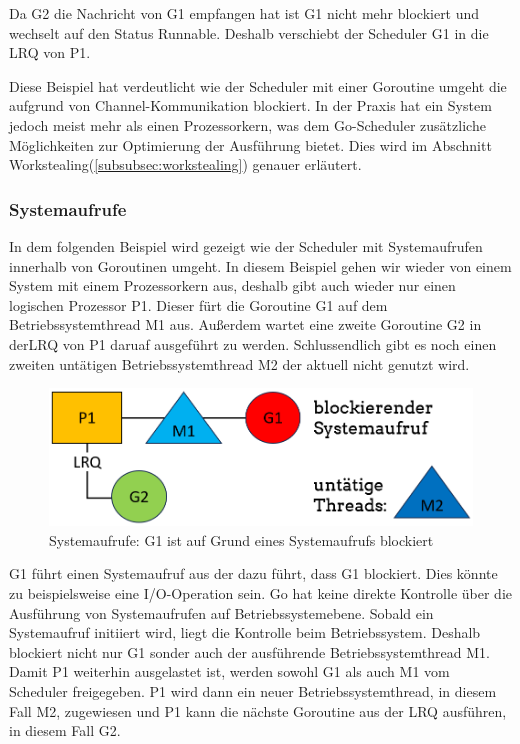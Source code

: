 \documentclass[fontsize=12pt,paper=a4,twoside=semi,parskip=half-,headsepline,headinclude]{scrreprt}
\begin{document}
Da G2 die Nachricht von G1 empfangen hat ist G1 nicht mehr blockiert und wechselt auf den Status Runnable. Deshalb verschiebt der Scheduler G1 in die LRQ von P1.

Diese Beispiel hat verdeutlicht wie der Scheduler mit einer Goroutine umgeht die aufgrund von Channel-Kommunikation blockiert. In der Praxis hat ein System jedoch meist mehr als einen Prozessorkern, was dem Go-Scheduler zusätzliche Möglichkeiten zur Optimierung der Ausführung bietet. Dies wird im Abschnitt Workstealing(\ref{subsubsec:workstealing}) genauer erläutert.

\subsubsection{Systemaufrufe}

In dem folgenden Beispiel wird gezeigt wie der Scheduler mit Systemaufrufen innerhalb von Goroutinen umgeht. In diesem Beispiel gehen wir wieder von einem System mit einem Prozessorkern aus, deshalb gibt auch wieder nur einen logischen Prozessor P1. Dieser fürt die Goroutine G1 auf dem Betriebssystemthread M1 aus. Außerdem wartet eine zweite Goroutine G2 in derLRQ von P1 daruaf ausgeführt zu werden. Schlussendlich gibt es noch einen zweiten untätigen Betriebssystemthread M2 der aktuell nicht genutzt wird.

\begin{figure}[h]
	\centering
	\includegraphics[scale=0.5]{figures/GoroutineSystemaufrufe1.png}
	\caption{Systemaufrufe: G1 ist auf Grund eines Systemaufrufs blockiert}
	\label{fig:GoroutineSystemaufrufe1}
\end{figure}

G1 führt einen Systemaufruf aus der dazu führt, dass G1 blockiert. Dies könnte zu beispielsweise eine I/O-Operation sein. Go hat keine direkte Kontrolle über die Ausführung von Systemaufrufen auf Betriebssystemebene. Sobald ein Systemaufruf initiiert wird, liegt die Kontrolle beim Betriebssystem. Deshalb blockiert nicht nur G1 sonder auch der ausführende Betriebssystemthread M1. Damit P1 weiterhin ausgelastet ist, werden sowohl G1 als auch M1 vom Scheduler freigegeben. P1 wird dann ein neuer Betriebssystemthread, in diesem Fall M2, zugewiesen und P1 kann die nächste Goroutine aus der LRQ ausführen, in diesem Fall G2.
\end{document}
